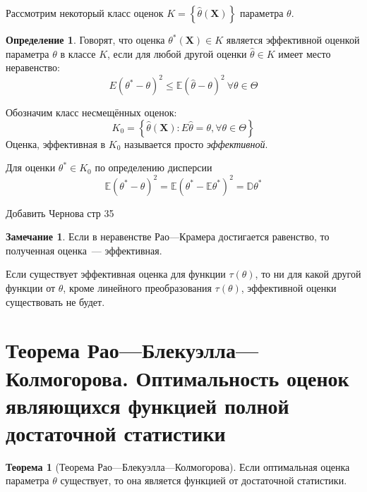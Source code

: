 \documentclass[oneside,final,14pt]{extreport}
\theoremstyle{plain}
\theoremstyle{definition}
\newtheorem*{defn}{Определение}
\newtheorem*{rmrk}{Замечание}
\theoremstyle{named}
\newtheorem*{namedthm}{Теорема}
\begin{document}
Рассмотрим некоторый класс оценок $K=\left\{\hat{\theta}\left(\mathbf{X}\right)\right\}$ параметра $\theta$.
\begin{defn}
    Говорят, что оценка $\theta^{*}\left(\mathbf{X}\right) \in K$ является эффективной оценкой параметра $\theta$ в классе $K$, если для любой другой оценки $\hat{\theta} \in K$ имеет место неравенство:
    \begin{equation*}
        E\left(\theta^{*}-\theta\right)^{2} \leqslant \mathbb{E}(\hat{\theta}-\theta)^{2}~ \forall \theta \in \Theta
    \end{equation*}
\end{defn}
Обозначим класс несмещённых оценок:
\begin{equation*}
    K_{0}=\left\{\hat{\theta}\left(\mathbf{X}\right): E \hat{\theta}=\theta, \forall \theta \in \Theta\right\}
\end{equation*}
Оценка, эффективная в $K_0$ называется просто {\it эффективной}.

Для оценки $\theta^{*} \in K_{0}$ по определению дисперсии
\begin{equation*}
    \mathbb{E}\left(\theta^{*}-\theta\right)^{2}=\mathbb{E}\left(\theta^{*}-\mathbb{E} \theta^{*}\right)^{2}=\mathbb{D} \theta^{*}
\end{equation*}

Добавить Чернова стр 35

\begin{rmrk}
Если в неравенстве Рао---Крамера достигается равенство, то полученная оценка~--- эффективная.

Если существует эффективная оценка для функции $\tau(\theta)$, то ни для какой другой функции от $\theta$, кроме линейного преобразования $\tau(\theta)$, эффективной оценки существовать не будет. 
\end{rmrk}

\section{Теорема Рао—Блекуэлла—Колмогорова. Оптимальность оценок являющихся функцией полной достаточной статистики}

\begin{namedthm}[Теорема Рао—Блекуэлла—Колмогорова] Если оптимальная оценка параметра $\theta$ существует, то она является функцией от достаточной статистики.
\end{namedthm}
\end{document}
